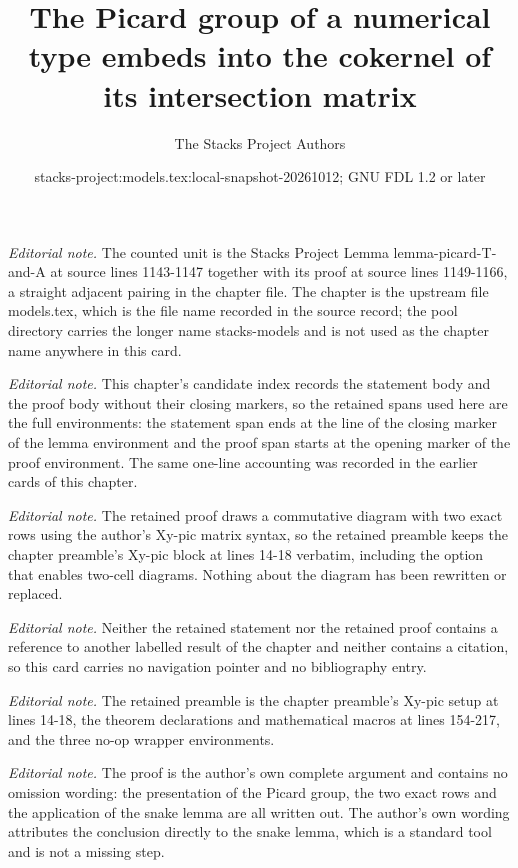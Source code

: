 \documentclass[10pt,a4paper]{amsart}
\title{The Picard group of a numerical type embeds into the cokernel of its intersection matrix}
\author{The Stacks Project Authors}
\date{stacks-project:models.tex:local-snapshot-20261012; GNU FDL 1.2 or later}
\theoremstyle{plain}
\theoremstyle{definition}
\theoremstyle{remark}
\numberwithin{equation}{subsection}
\begin{document}
\maketitle
\noindent\textit{Editorial note.} The counted unit is the Stacks Project Lemma lemma-picard-T-and-A at source lines 1143-1147 together with its proof at source lines 1149-1166, a straight adjacent pairing in the chapter file. The chapter is the upstream file models.tex, which is the file name recorded in the source record; the pool directory carries the longer name stacks-models and is not used as the chapter name anywhere in this card.\par\medskip
\noindent\textit{Editorial note.} This chapter's candidate index records the statement body and the proof body without their closing markers, so the retained spans used here are the full environments: the statement span ends at the line of the closing marker of the lemma environment and the proof span starts at the opening marker of the proof environment. The same one-line accounting was recorded in the earlier cards of this chapter.\par\medskip
\noindent\textit{Editorial note.} The retained proof draws a commutative diagram with two exact rows using the author's Xy-pic matrix syntax, so the retained preamble keeps the chapter preamble's Xy-pic block at lines 14-18 verbatim, including the option that enables two-cell diagrams. Nothing about the diagram has been rewritten or replaced.\par\medskip
\noindent\textit{Editorial note.} Neither the retained statement nor the retained proof contains a reference to another labelled result of the chapter and neither contains a citation, so this card carries no navigation pointer and no bibliography entry.\par\medskip
\noindent\textit{Editorial note.} The retained preamble is the chapter preamble's Xy-pic setup at lines 14-18, the theorem declarations and mathematical macros at lines 154-217, and the three no-op wrapper environments.\par\medskip
\noindent\textit{Editorial note.} The proof is the author's own complete argument and contains no omission wording: the presentation of the Picard group, the two exact rows and the application of the snake lemma are all written out. The author's own wording attributes the conclusion directly to the snake lemma, which is a standard tool and is not a missing step.\par\medskip
\end{document}
